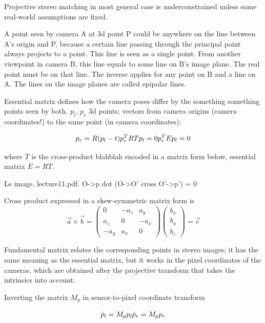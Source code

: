 Projective stereo matching in most general case is underconstrained unless some real-world assumptions are fixed.



A point seen by camera A at 3d point P could be anywhere on the line between A's origin and P, because a certain line passing through the principal point always projects to a point.
This line is seen as a single point.
From another viewpoint in camera B, this line equals to some line on B's image plane.
The real point must be on that line.
The inverse applies for any point on B and a line on A.
The lines on the image planes are called epipolar lines.


Essential matrix defines how the camera poses differ by the something something points seen by both. $p_l$, $p_r$ 3d points; vectors from camera origins (camera coordinates!) to the same point (in camera coordinates):

\[ \label{eq:essential}
	p_r = R (p_l - t) \\
	p_r^T R T p_l = 0 \\
	p_r^T E p_l = 0
\]

where $T$ is the cross-product blahblah encoded in a matrix form below, essential matrix $E = R T$.

Le image. lecture11.pdf. O->p dot (O->O' cross O'->p') = 0

Cross product expressed in a skew-symmetric matrix form is
\begin{equation}
\vec a \times \vec b =
\begin{pmatrix}
	 0   & -a_z &  a_y\\
	 a_z &  0   & -a_x\\
	-a_y &  a_x & 0
\end{pmatrix}
\begin{pmatrix}
	b_x\\b_y\\b_z
\end{pmatrix}
= \vec c
\end{equation}

Fundamental matrix relates the corresponding points in stereo images; it has the same meaning as the essential matrix, but it works in the pixel coordinates of the cameras, which are obtained after the projective transform that takes the intrinsics into account.

Inverting the matrix $M_p$ in sensor-to-pixel coordinate transform

\[
\hat p_l = M_p p_l\\
\hat p_r = M_p p_r
\]

